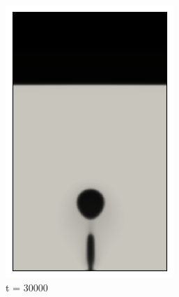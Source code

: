 \begin{figure}[H]
\begin{subfigure}{0.25\textwidth}
		\includegraphics[width=\linewidth]{figs/cap4/cuda_bb_760_d30}
		\caption{t = 30000}
		\label{fig:5}
	\end{subfigure}\hfil 
	\begin{subfigure}{0.25\textwidth}

\end{subfigure}
\end{figure}
